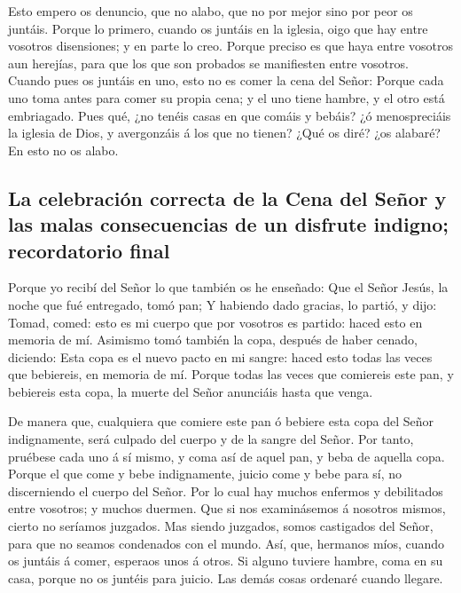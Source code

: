  Esto empero os denuncio, que no alabo, que no por mejor
sino por peor os juntáis.  Porque lo primero, cuando os
juntáis en la iglesia, oigo que hay entre vosotros disensiones; y en
parte lo creo.  Porque preciso es que haya entre vosotros
aun herejías, para que los que son probados se manifiesten entre
vosotros.  Cuando pues os juntáis en uno, esto no es
comer la cena del Señor:  Porque cada uno toma antes para
comer su propia cena; y el uno tiene hambre, y el otro está embriagado.
 Pues qué, ¿no tenéis casas en que comáis y bebáis? ¿ó
menospreciáis la iglesia de Dios, y avergonzáis á los que no tienen?
¿Qué os diré? ¿os alabaré? En esto no os alabo.

\hypertarget{la-celebraciuxf3n-correcta-de-la-cena-del-seuxf1or-y-las-malas-consecuencias-de-un-disfrute-indigno-recordatorio-final}{%
\subsection{La celebración correcta de la Cena del Señor y las malas
consecuencias de un disfrute indigno; recordatorio
final}\label{la-celebraciuxf3n-correcta-de-la-cena-del-seuxf1or-y-las-malas-consecuencias-de-un-disfrute-indigno-recordatorio-final}}

 Porque yo recibí del Señor lo que también os he
enseñado: Que el Señor Jesús, la noche que fué entregado, tomó pan;
 Y habiendo dado gracias, lo partió, y dijo: Tomad,
comed: esto es mi cuerpo que por vosotros es partido: haced esto en
memoria de mí.  Asimismo tomó también la copa, después de
haber cenado, diciendo: Esta copa es el nuevo pacto en mi sangre: haced
esto todas las veces que bebiereis, en memoria de mí. 
Porque todas las veces que comiereis este pan, y bebiereis esta copa, la
muerte del Señor anunciáis hasta que venga.

 De manera que, cualquiera que comiere este pan ó bebiere
esta copa del Señor indignamente, será culpado del cuerpo y de la sangre
del Señor.  Por tanto, pruébese cada uno á sí mismo, y
coma así de aquel pan, y beba de aquella copa.  Porque el
que come y bebe indignamente, juicio come y bebe para sí, no
discerniendo el cuerpo del Señor.  Por lo cual hay muchos
enfermos y debilitados entre vosotros; y muchos duermen. 
Que si nos examinásemos á nosotros mismos, cierto no seríamos juzgados.
 Mas siendo juzgados, somos castigados del Señor, para
que no seamos condenados con el mundo.  Así, que,
hermanos míos, cuando os juntáis á comer, esperaos unos á otros.
 Si alguno tuviere hambre, coma en su casa, porque no os
juntéis para juicio. Las demás cosas ordenaré cuando llegare.

